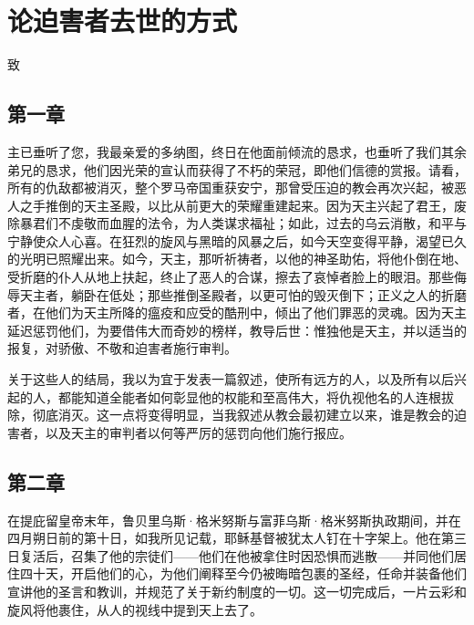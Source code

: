 
\chapter{论迫害者去世的方式}


致\par


\section{第一章}

主已垂听了您，我最亲爱的多纳图，终日在他面前倾流的恳求，也垂听了我们其余弟兄的恳求，他们因光荣的宣认而获得了不朽的荣冠，即他们信德的赏报。请看，所有的仇敌都被消灭，整个罗马帝国重获安宁，那曾受压迫的教会再次兴起，被恶人之手推倒的天主圣殿，以比从前更大的荣耀重建起来。因为天主兴起了君王，废除暴君们不虔敬而血腥的法令，为人类谋求福祉；如此，过去的乌云消散，和平与宁静使众人心喜。在狂烈的旋风与黑暗的风暴之后，如今天空变得平静，渴望已久的光明已照耀出来。如今，天主，那听祈祷者，以他的神圣助佑，将他仆倒在地、受折磨的仆人从地上扶起，终止了恶人的合谋，擦去了哀悼者脸上的眼泪。那些侮辱天主者，躺卧在低处；那些推倒圣殿者，以更可怕的毁灭倒下；正义之人的折磨者，在他们为天主所降的瘟疫和应受的酷刑中，倾出了他们罪恶的灵魂。因为天主延迟惩罚他们，为要借伟大而奇妙的榜样，教导后世：惟独他是天主，并以适当的报复，对骄傲、不敬和迫害者施行审判。\par

关于这些人的结局，我以为宜于发表一篇叙述，使所有远方的人，以及所有以后兴起的人，都能知道全能者如何彰显他的权能和至高伟大，将仇视他名的人连根拔除，彻底消灭。这一点将变得明显，当我叙述从教会最初建立以来，谁是教会的迫害者，以及天主的审判者以何等严厉的惩罚向他们施行报应。\par


\section{第二章}

在提庇留皇帝末年，鲁贝里乌斯·格米努斯与富菲乌斯·格米努斯执政期间，并在四月朔日前的第十日，如我所见记载，耶稣基督被犹太人钉在十字架上。他在第三日复活后，召集了他的宗徒们——他们在他被拿住时因恐惧而逃散——并同他们居住四十天，开启他们的心，为他们阐释至今仍被晦暗包裹的圣经，任命并装备他们宣讲他的圣言和教训，并规范了关于新约制度的一切。这一切完成后，一片云彩和旋风将他裹住，从人的视线中提到天上去了。\par

